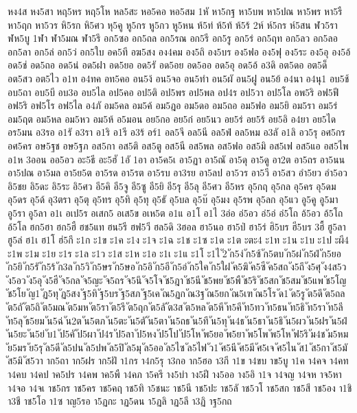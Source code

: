 {หง4ส
หง5สา
หฤ5หร
หฤ5โห
หล5สะ
หอ5คอ
หอ5สม
1หั
หา5กฐ
หา5บพ
หา5ปณ
หา5พร
หา5รื
หา5ฤก
หา5วร
หิ5รก
หิ5ศว
หุ5คู
หู5กร
หู5กว
หู5หน
ห้5ท่
ห้5ท้
ห้5ร้
2ห์
ห์5กร
ห์5สน
ฬว5รา
ฬห5บู
1ฬา
ฬา5มณ
ฬา5รึ
อก5ซอ
อก5ถล
อก5รณ
อก5รี
อก5รู
อก5ร่
อก5ฤท
อก5ลว
อก5ลอ
อก5ลา
อก5ล่
อก5ว่
อก5ใบ
อค5ที
อฆ5สง
อง4คม
อง5ถิ
อง5บร
อง5ฟอ
อง5ฟุ
อง5ระ
อง5อุ
อง5อ้
อด5ช่
อด5ถอ
อด5น่
อด5ฝา
อด5ยอ
อด5รั
อด5อย
อด5ออ
อด5อุ
อด5อ้
อ3ดิ
อต5ดอ
อต5ด็
อต5สว
อต5ไว
อ1ท
อ4ทค
อท5คอ
อน5ง้
อน5จอ
อน5ทำ
อน5ผั
อน5ฝู
อน5ย้
อ4นา
อ4นุ1
อบ5ช้
อบ5ถา
อบ5บี
อบ3อ
อบ5ไล
อป5คอ
อป5ติ
อป5พร
อป5พล
อป4ร
อป5วา
อป5โล
อพ5ริ
อฟ5ฟี
อฟ5ริ
อฟ5โร
อฟ5ไล
อ4ภั
อม5คล
อม5ค้
อม5ฎอ
อม5ดอ
อม5ถอ
อม5ฟอ
อม5ยิ
อม5รา
อม5ร่
อม5ฤต
อม5หล
อม5หว
อม5ห้
อ5มอน
อย5กอ
อย5ก๋
อย5นว
อย5ร่
อย5ร้
อย5อิ
อ4ยา
อย5ได
อร5มน
อ3รอ
อ1รั
อ3รา
อ1ริ
อ1รี
อ3ร้
อร์1
อล5จี
อล5นี
อล5ฟ่
อล5หม
อ3ลั
อ1ลิ
อว5รุ
อศ5กร
อศ5คร
อษ5ฐช
อษ5ฐภ
อส5กา
อส5ติ
อส5ตู
อส5นี
อส5พล
อส5ฟอ
อส5มิ
อส5เฟ
อส5แอ
อส5ไพ
อ1ห
3ออน
ออ5อว
อะ5ธี
อะ5ฮั
1อั
1อา
อา5ค5เ
อา5ฏา
อา5ณั
อา5ดุ
อา5ดู
อา2ต
อา5ถร
อา5นน
อา5ปณ
อา5มล
อา5ย5ต
อา5รด
อา5รต
อา5รบ
อา3รย
อา5ลป
อา5วร
อา5วี
อา5สว
อำ5ยว
อำ5อว
อิ5ชย
อิ5ดะ
อิ5ระ
อิ5ศว
อี5คิ
อี5จู
อี5ซู
อี5ยิ
อี5รุ
อี5ลุ
อี5ศว
อี5หร
อุ5กฤ
อุ5กล
อุ5คร
อุ5ดม
อุ5ดร
อุ5ด้
อุ3ตรา
อุ5ตุ
อุ5ทร
อุ5ทิ
อุ5ทุ
อุ5ธั
อุ5บล
อุ5บ๊
อุ5มง
อุ5รพ
อุ5ลก
อุ5แว
อู5คู
อู5มา
อู5รา
อู5ลา
อ1เ
อเป5ร
อเสก5
อเส5ข
อเห5ต
อ1แ
อ1โ
อ1ไ
3อ่อ
อ่5อว
อ่5อ่
อ่5โถ
อ้5อว
อ้5โถ
อ้5โล
ฮก5ฮา
ฮก5ฮื
ฮช5แท
ฮน5รี
ฮฟ5วี
ฮล5ดิ
3ฮอล
ฮา5นอ
ฮา5ป่
ฮา5ร่
ฮิ5บร
ฮี5บร
3ฮื้
ฮู5ลา
ฮู5ล่
ฮ1เ
ฮ1โ
ฮ่5กึ
ะ1ก
ะ1ข
ะ1ค
ะ1ง
ะ1จ
ะ1ฉ
ะ1ช
ะ1ซ
ะ1ด
ะ1ต
ะตะ4
ะ1ท
ะ1น
ะ1บ
ะ1ป
ะผี4
ะ1พ
ะ1ม
ะ1ย
ะ1ร
ะ1ล
ะ1ว
ะ1ส
ะ1ห
ะ1อ
ะ1เ
ะ1แ
ะ1โ
ะ1ไ
ั2
ัก5ง่
ัก5ซ้
ัก5ตบ
ัก5ผ่
ัก5ฝ่
ัก5ยอ
ัก5ยิ
ัก5รั
ัก5ร้
ัก3ล
ัก5วิ
ัก5ษร
ัก5ษอ
ัก5อิ
ัก5อี
ัก5อ่
ัก5ใค
ัก5ใฝ
ัค5ฆิ
ัค5ซี
ัค5สถ
ัง5ถึ
ัง5ศุ
ัง4ส5ว
ัง5อว
ัง5อุ
ัง5ฮี
ัจ5กล
ัจ5ญะ
ัจ5ถร
ัจ5นึ
ัจ5โจ
ัช5ฎา
ัช5นี
ัช5พย
ัช5พื
ัช5ริ
ัช5สก
ัช5สม
ัช5แพ
ัช5โญ
ัช5โย
ัญ1
ัฏ5ทุ
ัฏ5สง
ัฐ5ทิ
ัฐ5บร
ัฐ5สภ
ัฐ5เค
ัณ5ฏก
ัณ3ฐ
ัณ5ยก
ัณ5เฑ
ัณ5โร
ัด1
ัด5รู
ัต5ดึ
ัต5ถล
ัต5ถั
ัต5ถิ
ัต5มณ
ัต5มห
ัต5รา
ัต5รี
ัต5ฤก
ัต5ลั
ัต3ส
ัต5หล
ัต5หี
ัท5คี
ัท5ทว
ัท5ธน
ัท5ธิ
ัท5รา
ัท5ลี
ัท5ลุ
ัธ5ยม
ัน5ฉ่
ัน2ต
ัน5ตภ
ัน5ตะ
ัน5ตั
ัน5ตา
ัน5ถธ
ัน5ทึ
ัน5ทุ
ัน4ธ
ัน5ธา
ัน5ธิ
ัน5ผว
ัน5ฝร
ัน5ฝ่
ัน5ยะ
ัน5ย่
ับ1
ัป5คั
ัป5ผา
ัป4ร
ัป5ลา
ัป5หง
ัป5โป
ัป5โห
ัพ5ยอ
ัพ5ยา
ัพ5โพ
ัพ5โห
ัฟ5ริ
ัม4ช
ัม5หม
ัย5มร
ัย5รุ
ัล5ดี
ัล5ปน
ัล5ปพ
ัล5ปิ
ัล5มุ
ัล5ออ
ัล5ไซ
ัล5ไฟ
ัว1
ัศ5นี
ัศ5มี
ัศ5เจ
ัศ5ไน
ัส1
ัส5กา
ัส5มั
ัส5มิ
ัส5วา
าก5ถา
าก5ฝร
าก5ฝั
า1กร
า4ก5รุ
า3กอ
าก5ฮอ
า3กี
า1ข
า4ขบ
าข5บู
า1ค
า4คจ
า4คท
า4คบ
า4คป
าค5ปร
า4คพ
าค5พื
า4คภ
า5ครี
าง5บำ
าง5ฝี
าง5ออ
าง5อิ
า1จ
า4จญ
า4จห
าจ5หา
า4จอ
า4จเ
าช5กร
าช5คร
าช5คฤ
าช5ทิ
า5ชนะ
าช5นี
าช5ปะ
าช5ลั
าช5วโ
าช5สก
าช5สี
าช5อง
า1ชิ
า3ชี
าช5โอ
า1ซ
าญ5รอ
า5ฏกะ
าฏ5ดน
า5ฏลิ
าฏ5ลี
า3ฏิ
าฐ5กถ
}
